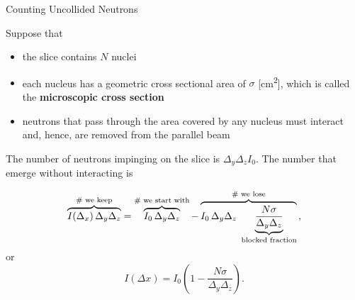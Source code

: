 \documentclass[aspectratio=1610]{beamer}
\begin{document}
\begin{frame}{Counting Uncollided Neutrons}

Suppose that 
\begin{itemize}
 \item the slice contains $N$ nuclei
 \item each nucleus has a geometric cross sectional area of $\sigma$ [\si{cm^2}], which is called the {\bf microscopic cross section}
 \item neutrons that pass through the area covered by any nucleus must interact and, hence, are removed from the parallel beam
\end{itemize}

The number of neutrons 
impinging on the slice is $\Delta_y \Delta_z I_0$.  The number that emerge without interacting is

\begin{equation*}
\overbrace{I(\Delta_x)\, \Delta_y \Delta_z}^{\text{\# we keep}}
= \overbrace{I_0\,\Delta_y \Delta_z}^{\text{\# we start with}}
- \overbrace{I_0\,\Delta_y \Delta_z\;\underbrace{\vphantom{\Big(}\frac{N\sigma}{\Delta_y \Delta_z}}_{\text{blocked fraction}}}^{\text{\# we lose}} \, ,
\end{equation*}
or
\begin{equation*}
I(\Delta x) = I_0\!\left(1 - \frac{N\sigma}{\Delta_y \Delta_z}\right).
\end{equation*}
 
\end{frame}
\end{document}
